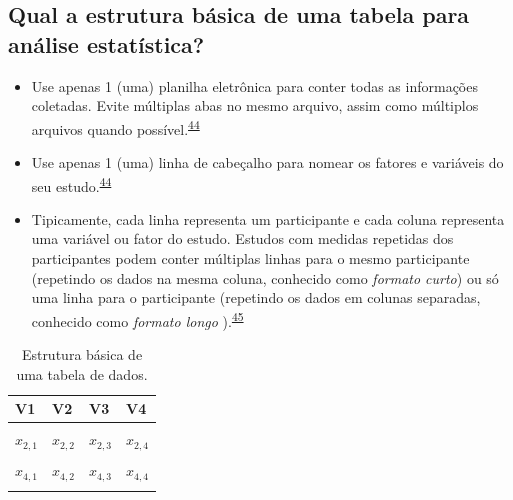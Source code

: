 \documentclass[
]{book}
\begin{document}
\hypertarget{qual-a-estrutura-buxe1sica-de-uma-tabela-para-anuxe1lise-estatuxedstica}{%
\subsection{Qual a estrutura básica de uma tabela para análise estatística?}\label{qual-a-estrutura-buxe1sica-de-uma-tabela-para-anuxe1lise-estatuxedstica}}

\begin{itemize}
\item
  Use apenas 1 (uma) planilha eletrônica para conter todas as informações coletadas. Evite múltiplas abas no mesmo arquivo, assim como múltiplos arquivos quando possível.\textsuperscript{\protect\hyperlink{ref-broman2018}{44}}
\item
  Use apenas 1 (uma) linha de cabeçalho para nomear os fatores e variáveis do seu estudo.\textsuperscript{\protect\hyperlink{ref-broman2018}{44}}
\item
  Tipicamente, cada linha representa um participante e cada coluna representa uma variável ou fator do estudo. Estudos com medidas repetidas dos participantes podem conter múltiplas linhas para o mesmo participante (repetindo os dados na mesma coluna, conhecido como \emph{formato curto}) ou só uma linha para o participante (repetindo os dados em colunas separadas, conhecido como \emph{formato longo} ).\textsuperscript{\protect\hyperlink{ref-Juluru2015}{45}}
\end{itemize}

\begin{table}

\caption{\label{tab:tabela-0}Estrutura básica de uma tabela de dados.}
\centering
\begin{tabu} to 
\toprule
\textbf{V1} & \textbf{V2} & \textbf{V3} & \textbf{V4}\\
\midrule
{} &  &  & \\
$x_{2,1}$ & $x_{2,2}$ & $x_{2,3}$ & $x_{2,4}$\\
 &  &  & \\
$x_{4,1}$ & $x_{4,2}$ & $x_{4,3}$ & $x_{4,4}$\\
 &  &  & \\
\bottomrule
\end{tabu}
\end{table}
\end{document}
